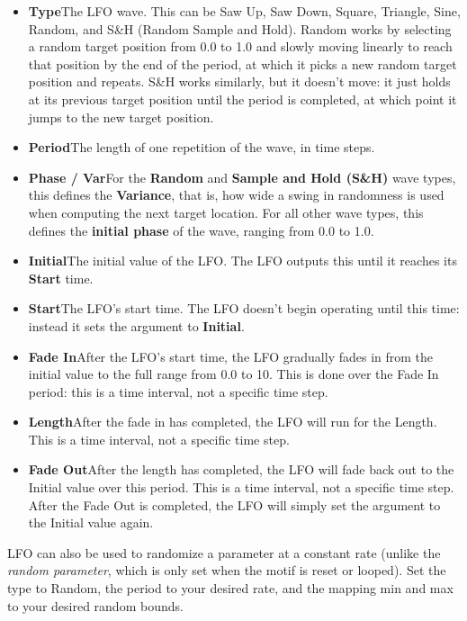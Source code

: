 \documentclass[twoside,10pt]{article}
\begin{document}
\begin{itemize}
\item {\bf Type}\qquad The LFO wave.  This can be Saw Up, Saw Down, Square, Triangle, Sine, Random, and S\&H (Random Sample and Hold).  Random works by selecting a random target position from 0.0 to 1.0 and slowly moving linearly to reach that position by the end of the period, at which it picks a new random target position and repeats.  S\&H works similarly, but it doesn't move: it just holds at its previous target position until the period is completed, at which point it jumps to the new target position.
\item {\bf Period}\qquad The length of one repetition of the wave, in time steps.
\item {\bf Phase / Var}\qquad For the {\bf Random} and {\bf Sample and Hold (S\&H)} wave types, this defines the {\bf Variance}, that is, how wide a swing in randomness is used when computing the next target location.  For all other wave types, this defines the {\bf initial phase} of the wave, ranging from 0.0 to 1.0.
\item {\bf Initial}\qquad The initial value of the LFO.   The LFO outputs this until it reaches its {\bf Start} time.
\item {\bf Start}\qquad The LFO's start time.  The LFO doesn't begin operating until this time: instead it sets the argument to {\bf Initial}.
\item {\bf Fade In}\qquad After the LFO's start time, the LFO gradually fades in from the initial value to the full range from 0.0 to 10.  This is done over the Fade In period: this is a time interval, not a specific time step.
\item {\bf Length}\qquad After the fade in has completed, the LFO will run for the Length.  This is a time interval, not a specific time step.
\item {\bf Fade Out}\qquad After the length has completed, the LFO will fade back out to the Initial value over this period.  This is a time interval, not a specific time step.  After the Fade Out is completed, the LFO will simply set the argument to the Initial value again.
\end{itemize}

LFO can also be used to randomize a parameter at a constant rate (unlike the {\it random parameter}, which is only set when the motif is reset or looped).  Set the type to Random, the period to your desired rate, and the mapping min and max to your desired random bounds.
\end{document}
